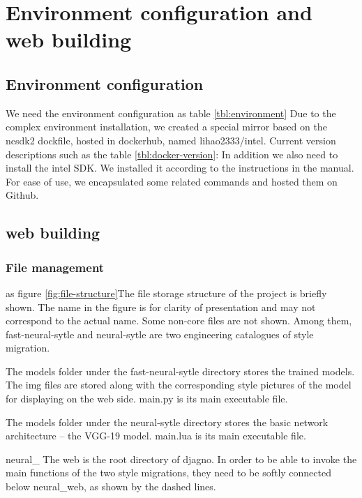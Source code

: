 \section{Environment configuration and web building}
\subsection{Environment configuration}
We need the environment configuration as table \ref{tbl:environment}
Due to the complex environment installation, we created a special mirror based on the ncsdk2 dockfile, hosted in dockerhub, named lihao2333/intel.
Current version descriptions such as the table \ref{tbl:docker-version}:
In addition we also need to install the intel SDK. We installed it according to the instructions in the manual. For ease of use, we encapsulated some related commands and hosted them on Github.\cite{rcClub}
\subsection{web building}
\subsubsection{File management}
as figure \ref{fig:file-structure}The file storage structure of the project is briefly shown. The name in the figure is for clarity of presentation and may not correspond to the actual name. Some non-core files are not shown.
Among them, fast-neural-sytle and neural-sytle are two engineering catalogues of style migration.

The models folder under the fast-neural-sytle directory stores the trained models. The img files are stored along with the corresponding style pictures of the model for displaying on the web side. main.py is its main executable file.

The models folder under the neural-sytle directory stores the basic network architecture -- the VGG-19 model. main.lua is its main executable file.

neural\_
The web is the root directory of djagno. In order to be able to invoke the main functions of the two style migrations, they need to be softly connected below neural\_web, as shown by the dashed lines.


